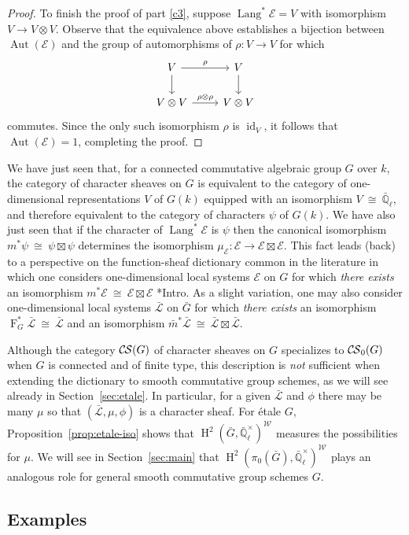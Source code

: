 \documentclass[10pt]{amsart}
\theoremstyle{plain}
\theoremstyle{definition}
\theoremstyle{remark}
\newcommand{\EE}{\mathbb{\bar Q}_\ell}
\newcommand{\Fq}{k}
\newcommand{\EEx}{\EE^\times}
\newcommand{\Weil}[1]{\mathcal{W}_{#1}}
\newcommand{\Frob}[1]{\operatorname{F}_{#1}}
\DeclareMathOperator{\Aut}{Aut}
\DeclareMathOperator{\id}{id}
\DeclareMathOperator{\Hh}{H}
\DeclareMathOperator{\Lang}{Lang}
\newcommand{\iso}{{\ \cong\ }}
\newcommand{\cs}[1]{{\mathcal{#1}}}
\newcommand{\gcs}[1]{{\mathcal{\bar #1}}}
\newcommand{\CS}{{\mathcal{C\hskip-0.8pt S}}}
\newcommand{\bCS}{{\CS_0}}
\newcommand{\bm}{\bar{m}}
\newcommand{\bG}{\bar{G}}
\begin{document}
\begin{proof}
To finish the proof of part \ref{c3}, suppose $\Lang^*\cs{E} = V$ with isomorphism $V \to V\otimes V$.  Observe that the equivalence above establishes a bijection between $\Aut(\cs{E})$ and the group of automorphisms of $\rho : V\to V$ for which 
\[
\begin{tikzcd}
\arrow{d}{} V \arrow{r}{\rho} & V\arrow{d}{}\\
V\otimes V \arrow{r}{\rho\otimes \rho} & V\otimes V
\end{tikzcd}
\]
commutes. 
Since the only such isomorphism $\rho$ is $\id_V$, it follows that $\Aut(\cs{E}) = 1$, completing the proof.
\end{proof}

We have just seen that, for a connected commutative algebraic group $G$ over $\Fq$, the category of character sheaves on $G$ is equivalent to the category of one-dimensional representations $V$ of $G(\Fq)$ equipped with an isomorphism $V\iso \EE$, and therefore equivalent to the category of characters $\psi$ of $G(\Fq)$.
We have also just seen that if the character of $\Lang^*\cs{E}$ is $\psi$ then the canonical isomorphism $m^*\psi \iso \psi \boxtimes \psi$ determines the isomorphism $\mu_\cs{E} : \cs{E} \to \cs{E}\boxtimes\cs{E}$.
This fact leads (back) to a perspective on the function-sheaf dictionary common in the literature in which one considers one-dimensional local systems $\cs{E}$ on $G$ for which \emph{there exists} an isomorphism $m^*\cs{E} \iso \cs{E} \boxtimes\cs{E}$ \cite{kamgarpour:09a}*{Intro}.
As a slight variation, one may also consider one-dimensional local systems $\gcs{L}$ on $\bG$ for which \emph{there exists} an isomorphism $\Frob{G}^*\gcs{L} \iso \gcs{L}$ and an isomorphism $\bm^*\gcs{L} \iso \gcs{L} \boxtimes\gcs{L}$.

Although the category $\CS(G)$ of character sheaves on $G$ specializes to $\bCS(G)$ when $G$ is connected and of finite type, this description is \emph{not} sufficient when extending the dictionary to smooth commutative group schemes, as we will see already in Section~\ref{sec:etale}.
In particular, for a given $\gcs{L}$ and $\phi$ there may be many $\mu$ so that $(\gcs{L},\mu,\phi)$ is a character sheaf.  For \'etale $G$, Proposition~\ref{prop:etale-iso} shows that $\Hh^2(\bG,\EEx)^{\Weil{}}$ measures the possibilities for $\mu$.  We will see in Section~\ref{sec:main} that $\Hh^2(\pi_0(\bG),\EEx)^{\Weil{}}$ plays an analogous role for general smooth commutative group schemes $G$.

\subsection{Examples}
\end{document}

